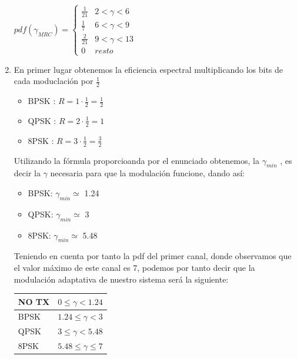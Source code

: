\documentclass[fleqn,14pt]{article}
\begin{document}
\begin{enumerate}[1.]
     $pdf(\gamma_{MRC}) =
     \begin{cases}
       \frac{1}{21} & 2 <  \gamma < 6 \\
       \frac{1}{7} & 6 <  \gamma < 9 \\
       \frac{2}{21} & 9 <  \gamma < 13 \\
       0 & resto
     \end{cases}$

     \raggedright
     \item En primer lugar obtenemos la eficiencia espectral multiplicando los bits de cada moduclación por $\frac{1}{2}$
     \begin{itemize}
       \centering
       \item BPSK : $R = 1 \cdot \frac{1}{2} = \frac{1}{2} $
       \item QPSK : $R = 2 \cdot \frac{1}{2} = 1 $
       \item 8PSK : $R = 3 \cdot \frac{1}{2} = \frac{3}{2} $
     \end{itemize}

    \raggedright
    Utilizando la fórmula proporcioanda por el enunciado obtenemos, la $\gamma_{min}$ , es decir la $\gamma$ necesaria para que la modulación funcione, dando así:
    \begin{itemize}
       \centering
      \item BPSK:   $\gamma_{min} \simeq$ 1.24
      \item QPSK:   $\gamma_{min} \simeq$  3
      \item 8PSK:   $\gamma_{min} \simeq$  5.48
    \end{itemize}

    \raggedright
    Teniendo en cuenta por tanto la pdf del primer canal, donde observamos que el valor máximo de este canal es 7, podemos por tanto decir que la modulación adaptativa de nuestro sistema será la siguiente:
    \begin{table}[htbp]
      \begin{center}
        \begin{tabular}{|l|l|}
          \hline
          NO TX & $0\leq\gamma<1.24$\\ \hline
          BPSK & $1.24\leq\gamma<3$ \\ \hline
          QPSK & $3\leq\gamma<5.48$ \\ \hline
          8PSK & $5.48\leq\gamma\leq7$ \\ \hline
        \end{tabular}
        \label{tabla:sencilla}
      \end{center}
    \end{table}


\end{enumerate}
\end{document}
